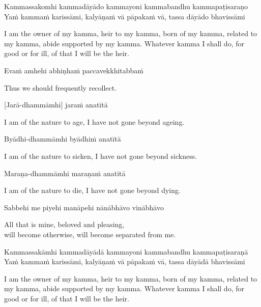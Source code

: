 Kammassakomhi kammadāyādo kammayoni kammabandhu kammapaṭisaraṇo\\
Yaṁ kammaṁ karissāmi, kalyāṇaṁ vā pāpakaṁ vā, tassa dāyādo bhavissāmi

\begin{english}
  I am the owner of my kamma, heir to my kamma, born of my kamma, related to my
  kamma, abide supported by my kamma. Whatever kamma I shall do, for good or for
  ill, of that I will be the heir.
\end{english}

Evaṁ amhehi abhiṇhaṁ paccavekkhitabbaṁ

\begin{english}
  Thus we should frequently recollect.
\end{english}


[Jarā-dhammāmhi] jaraṁ anatītā

\begin{english}
  I am of the nature to age, I have not gone beyond ageing.
\end{english}

Byādhi-dhammāmhi byādhiṁ anatītā

\begin{english}
  I am of the nature to sicken, I have not gone beyond sickness.
\end{english}

Maraṇa-dhammāmhi maraṇaṁ anatītā

\begin{english}
  I am of the nature to die, I have not gone beyond dying.
\end{english}

Sabbehi me piyehi manāpehi nānābhāvo vinābhāvo

\begin{english}
  All that is mine, beloved and pleasing,\\
  will become otherwise, will become separated from me.
\end{english}

Kammassakāmhi kammadāyādā kammayoni kammabandhu kammapaṭisaraṇā\\
Yaṁ kammaṁ karissāmi, kalyāṇaṁ vā pāpakaṁ vā, tassa dāyādā bhavissāmi

\begin{english}
  I am the owner of my kamma, heir to my kamma, born of my kamma, related to my
  kamma, abide supported by my kamma. Whatever kamma I shall do, for good or for
  ill, of that I will be the heir.
\end{english}

